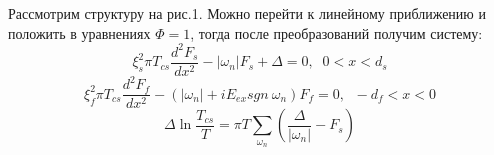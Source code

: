 \documentclass{article}
\begin{document}
Рассмотрим структуру на рис.1. Можно перейти к линейному приближению и положить в уравнениях $\Phi=1$, тогда после преобразований получим систему:
\begin{equation}
    \xi_s^2\pi T_{cs}\frac{d^2 F_s}{d x^2} - |\omega_n|F_s + \Delta = 0, \; \; 0<x<d_s
\end{equation}
\begin{equation}
    \xi_f^2\pi T_{cs}\frac{d^2 F_f}{d x^2} - (|\omega_n| + iE_{ex}sgn\: \omega_n)F_f = 0, \; \; -d_f<x<0
\end{equation}
\begin{equation}
    \Delta \ln \frac{T_{cs}}{T} = \pi T \sum\limits_{\omega_n}\left( \frac{\Delta}{|\omega_n|} - F_s\right)
\end{equation}

\printbibliography
\end{document}
